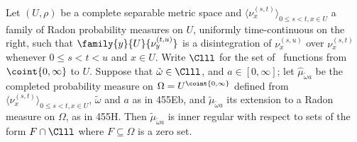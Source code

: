  Let $(U,\rho)$ be a complete separable metric space
and $\langle\nu^{(s,t)}_x\rangle_{0\le s<t,x\in U}$ a family of
Radon probability measures on $U$, uniformly time-continuous on the right,
such that $\family{y}{U}{\nu_y^{(t,u)}}$ is a disintegration of
$\nu_x^{(s,u)}$ over $\nu_x^{(s,t)}$ whenever $0\le s<t<u$ and $x\in U$.
Write $\Clll$ for the set of \callal\ functions from
$\coint{0,\infty}$ to $U$.
Suppose that $\tilde\omega\in\Clll$, and
$a\in[0,\infty]$;   let $\hat\mu_{\tilde\omega a}$ be the completed
probability measure on $\Omega=U^{\coint{0,\infty}}$ defined from
$\langle\nu^{(s,t)}_x\rangle_{0\le s<t,x\in U}$, $\tilde\omega$ and $a$
as in 455Eb, and $\tilde\mu_{\tilde\omega a}$ its extension to a Radon
measure on $\Omega$, as in 455H.   Then $\tilde\mu_{\tilde\omega a}$ is
inner regular with
respect to sets of the form $F\cap\Clll$ where $F\subseteq\Omega$ is a zero
set.


